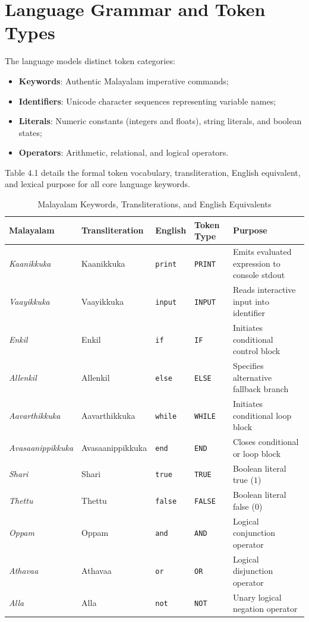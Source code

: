 \documentclass[12pt,a4paper]{report}
\begin{document}
\section{Language Grammar and Token Types}
The language models distinct token categories:
\begin{itemize}
    \item \textbf{Keywords}: Authentic Malayalam imperative commands;
    \item \textbf{Identifiers}: Unicode character sequences representing variable names;
    \item \textbf{Literals}: Numeric constants (integers and floats), string literals, and boolean states;
    \item \textbf{Operators}: Arithmetic, relational, and logical operators.
\end{itemize}
Table 4.1 details the formal token vocabulary, transliteration, English equivalent, and lexical purpose for all core language keywords.

\begin{table}[htbp]
    \centering
    \caption{Malayalam Keywords, Transliterations, and English Equivalents}
    \label{tab:keywords}
    \vspace{0.2cm}
    \begin{tabularx}{\textwidth}{llllX}
        \toprule
        \textbf{Malayalam} & \textbf{Transliteration} & \textbf{English} & \textbf{Token Type} & \textbf{Purpose} \\
        \midrule
        \textit{Kaanikkuka} & Kaanikkuka & \texttt{print} & \texttt{PRINT} & Emits evaluated expression to console stdout \\
        \textit{Vaayikkuka} & Vaayikkuka & \texttt{input} & \texttt{INPUT} & Reads interactive input into identifier \\
        \textit{Enkil} & Enkil & \texttt{if} & \texttt{IF} & Initiates conditional control block \\
        \textit{Allenkil} & Allenkil & \texttt{else} & \texttt{ELSE} & Specifies alternative fallback branch \\
        \textit{Aavarthikkuka} & Aavarthikkuka & \texttt{while} & \texttt{WHILE} & Initiates conditional loop block \\
        \textit{Avasaanippikkuka} & Avasaanippikkuka & \texttt{end} & \texttt{END} & Closes conditional or loop block \\
        \textit{Shari} & Shari & \texttt{true} & \texttt{TRUE} & Boolean literal true ($1$) \\
        \textit{Thettu} & Thettu & \texttt{false} & \texttt{FALSE} & Boolean literal false ($0$) \\
        \textit{Oppam} & Oppam & \texttt{and} & \texttt{AND} & Logical conjunction operator \\
        \textit{Athavaa} & Athavaa & \texttt{or} & \texttt{OR} & Logical disjunction operator \\
        \textit{Alla} & Alla & \texttt{not} & \texttt{NOT} & Unary logical negation operator \\
        \bottomrule
    \end{tabularx}
\end{table}
\end{document}
